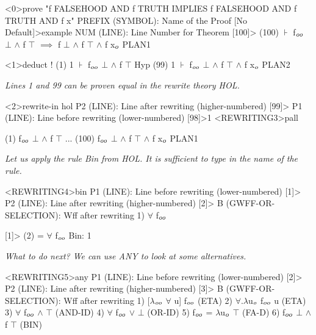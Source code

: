 \begin{tpsexample}
<0>prove "f FALSEHOOD AND f TRUTH IMPLIES f FALSEHOOD AND f TRUTH AND f x"
PREFIX (SYMBOL): Name of the Proof [No Default]>example
NUM (LINE): Line Number for Theorem [100]>
(100) \(\assert\)  f\(\sb{oo}\) \(\bot\) \(\land\) f \(\top\) \(\implies\) f \(\bot\) \(\land\) f \(\top\) \(\land\) f x\(\sb{o}\)                                   PLAN1

<1>deduct !
(1)   1 \(\assert\)  f\(\sb{oo}\) \(\bot\) \(\land\) f \(\top\)                                                      Hyp
(99)  1 \(\assert\)  f\(\sb{oo}\) \(\bot\) \(\land\) f \(\top\) \(\land\) f x\(\sb{o}\)                                             PLAN2

{\it Lines 1 and 99 can be proven equal in the rewrite theory HOL.}

<2>rewrite-in hol
P2 (LINE): Line after rewriting (higher-numbered) [99]>
P1 (LINE): Line before rewriting (lower-numbered) [98]>1
<REWRITING3>pall

(1)      f\(\sb{oo}\) \(\bot\) \(\land\) f \(\top\)
               ...
(100)    f\(\sb{oo}\) \(\bot\) \(\land\) f \(\top\) \(\land\) f x\(\sb{o}\)                                               PLAN1

{\it Let us apply the rule Bin from HOL. It is sufficient to type in the name of the rule.}

<REWRITING4>bin
P1 (LINE): Line before rewriting  (lower-numbered) [1]>
P2 (LINE): Line after rewriting  (higher-numbered) [2]>
B (GWFF-OR-SELECTION): Wff after rewriting
 1)  \(\forall\) f\(\sb{oo}\)

 [1]>
(2)   =  \(\forall\) f\(\sb{oo}\)                                                           Bin: 1

{\it What to do next? We can use ANY to look at some alternatives.}

<REWRITING5>any
P1 (LINE): Line before rewriting  (lower-numbered) [2]>
P2 (LINE): Line after rewriting  (higher-numbered) [3]>
B (GWFF-OR-SELECTION): Wff after rewriting
 1)  [\(\lambda\)\(\sb{oo}\) \(\forall\) u] f\(\sb{oo}\)  (ETA)
 2)  \(\forall\).\(\lambda\)u\(\sb{o}\) f\(\sb{oo}\) u  (ETA)
 3)  \(\forall\) f\(\sb{oo}\) \(\land\) \(\top\)  (AND-ID)
 4)  \(\forall\) f\(\sb{oo}\) \(\lor\) \(\bot\)  (OR-ID)
 5)  f\(\sb{oo}\) = \(\lambda\)u\(\sb{o}\) \(\top\)  (FA-D)
 6)  f\(\sb{oo}\) \(\bot\) \(\land\) f \(\top\)  (BIN)


\end{tpsexample}
